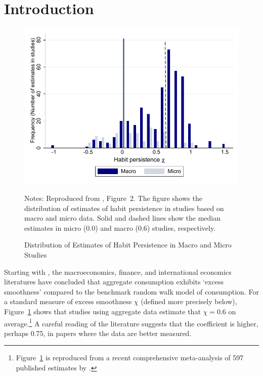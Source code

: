 \documentclass[titlepage]{./econtex}
\begin{document}


\section{Introduction}\label{sec:introduction}


\begin{figure}
  \centering
\caption{Distribution of Estimates of Habit Persistence in Macro and Micro Studies}
\label{microMacroMetaHistogram}
    { \includegraphics[width=1.0\textwidth]{./Figures/microMacroMetaHistogram}}

    \begin{flushleft}
      \footnotesize Notes: Reproduced from \cite{hrsHabit}, Figure~2. The figure shows the distribution of estimates of habit persistence in studies based on macro and micro data. Solid and dashed lines show the median estimates in micro (0.0) and macro (0.6) studies, respectively.
      \end{flushleft}
\end{figure}

Starting with \cite{cdSmooth}, the macroeconomics, finance, and international economics literatures have concluded that aggregate consumption exhibits `excess smoothness' compared to the benchmark \cite{hallRandomWalk} random walk model of consumption. For a standard measure of excess smoothness $\chi$ (defined more precisely below), Figure~\ref{microMacroMetaHistogram} shows that studies using aggregate data estimate that $\chi=0.6$ on average.\footnote{Figure~\ref{microMacroMetaHistogram} is reproduced from a recent comprehensive meta-analysis of 597 published estimates by \cite{hrsHabit}.} A careful reading of the literature suggests that the coefficient is higher, perhaps 0.75, in papers where the data are better measured.
\end{document}
